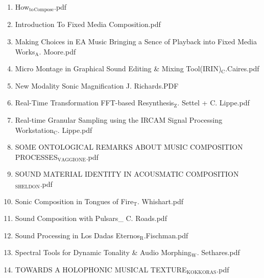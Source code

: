 \documentclass[11pt]{article}
\begin{document}
\begin{enumerate}
\item How$_{\text{to}}$$_{\text{Compose}}$.pdf
\label{sec-1-1-1-1-49-1-6-14}

\item Introduction To Fixed Media Composition.pdf
\label{sec-1-1-1-1-49-1-6-15}

\item Making Choices in EA Music Bringing a Sence of Playback into Fixed Media Works$_{\text{A}}$. Moore.pdf
\label{sec-1-1-1-1-49-1-6-16}

\item Micro Montage in Graphical Sound Editing \& Mixing Tool(IRIN)$_{\text{C}}$.Caires.pdf
\label{sec-1-1-1-1-49-1-6-17}

\item New Modality Sonic Magnification J. Richards.PDF
\label{sec-1-1-1-1-49-1-6-18}

\item Real-Time Transformation FFT-based Resynthesis$_{\text{Z}}$. Settel + C. Lippe.pdf
\label{sec-1-1-1-1-49-1-6-19}

\item Real-time Granular Sampling using the IRCAM Signal Processing Workstation$_{\text{C}}$. Lippe.pdf
\label{sec-1-1-1-1-49-1-6-20}

\item SOME ONTOLOGICAL REMARKS ABOUT MUSIC COMPOSITION PROCESSES$_{\text{VAGGIONE}}$.pdf
\label{sec-1-1-1-1-49-1-6-21}

\item SOUND MATERIAL IDENTITY IN ACOUSMATIC COMPOSITION$_{\text{SHELDON}}$.pdf
\label{sec-1-1-1-1-49-1-6-22}

\item Sonic Composition in Tongues of Fire$_{\text{T}}$. Whishart.pdf
\label{sec-1-1-1-1-49-1-6-23}

\item Sound Composition with Pulsars\_ C. Roads.pdf
\label{sec-1-1-1-1-49-1-6-24}

\item Sound Processing in Los Dadas Eternos$_{\text{R}}$.Fischman.pdf
\label{sec-1-1-1-1-49-1-6-25}

\item Spectral Tools for Dynamic Tonality \& Audio Morphing$_{\text{W}}$. Sethares.pdf
\label{sec-1-1-1-1-49-1-6-26}

\item TOWARDS A HOLOPHONIC MUSICAL TEXTURE$_{\text{KOKKORAS}}$.pdf
\label{sec-1-1-1-1-49-1-6-27}


\end{enumerate}
\end{document}
